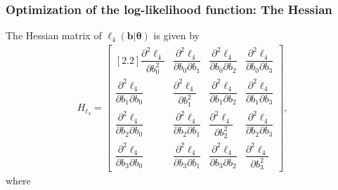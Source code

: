 \documentclass[11pt, letterpaper]{article}
\begin{document}
\subsubsection{Optimization of the log-likelihood function: The Hessian}
The Hessian matrix of $\ell_4(\bm b | \bm \theta)$ is given by
\begin{align*}
H_{\ell_4} = \begin{bmatrix}[2.2]
\dfrac{\partial^2 \ell_4}{\partial b_0 ^2} & \dfrac{\partial^2 \ell_4}{\partial b_0 \partial b_1} & \dfrac{\partial^2 \ell_4}{\partial b_0 \partial b_2} & \dfrac{\partial^2 \ell_4}{\partial b_0 \partial b_3} \\
\dfrac{\partial^2 \ell_4}{\partial b_1  \partial b_0} & \dfrac{\partial^2 \ell_4}{\partial b_1^2} & \dfrac{\partial^2 \ell_4}{\partial b_1 \partial b_2} & \dfrac{\partial^2 \ell_4}{\partial b_1 \partial b_3}\\
\dfrac{\partial^2 \ell_4}{\partial b_2  \partial b_0}  & \dfrac{\partial^2 \ell_4}{\partial b_2 \partial b_1} & \dfrac{\partial^2 \ell_4}{\partial b_2^2} & \dfrac{\partial^2 \ell_4}{\partial b_2 \partial b_3}\\
\dfrac{\partial^2 \ell_4}{\partial b_3  \partial b_0}  & \dfrac{\partial^2 \ell_4}{\partial b_3 \partial b_1} & \dfrac{\partial^2 \ell_4}{\partial b_3 \partial b_2} & \dfrac{\partial^2 \ell_4}{\partial b_3^2}
\end{bmatrix},
\end{align*}
where
\end{document}
